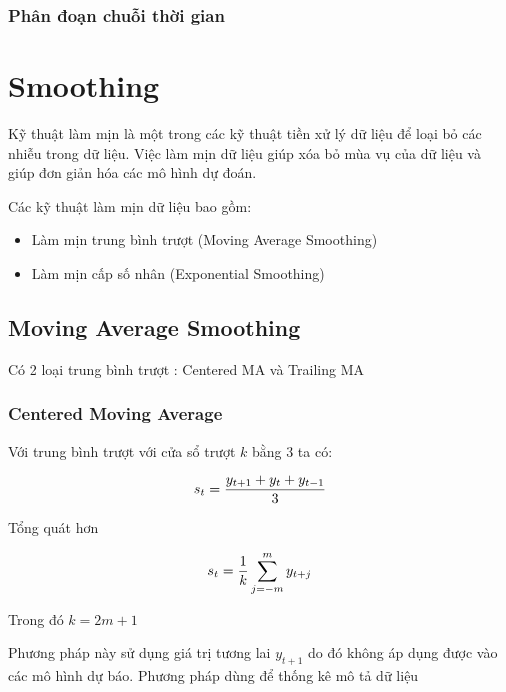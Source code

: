 \documentclass[
]{book}
\providecommand{\tightlist}{%
  \setlength{\itemsep}{0pt}\setlength{\parskip}{0pt}}
\begin{document}
\subsection{Phân đoạn chuỗi thời gian}\label{phuxe2n-ux111oux1ea1n-chuux1ed7i-thux1eddi-gian}

\chapter{Smoothing}\label{smoothing}

Kỹ thuật làm mịn là một trong các kỹ thuật tiền xử lý dữ liệu để loại bỏ các nhiễu trong dữ liệu. Việc làm mịn dữ liệu giúp xóa bỏ mùa vụ của dữ liệu và giúp đơn giản hóa các mô hình dự đoán.

Các kỹ thuật làm mịn dữ liệu bao gồm:

\begin{itemize}
\tightlist
\item
  Làm mịn trung bình trượt (Moving Average Smoothing)
\item
  Làm mịn cấp số nhân (Exponential Smoothing)
\end{itemize}

\section{Moving Average Smoothing}\label{moving-average-smoothing}

Có 2 loại trung bình trượt : Centered MA và Trailing MA

\subsection{Centered Moving Average}\label{centered-moving-average}

Với trung bình trượt với cửa sổ trượt \(k\) bằng 3 ta có:

\[\begin{aligned}
\Large s_{t} = \frac{y_{t+1} + y_{t} + y_{t-1}}{3}
\end{aligned}\]

Tổng quát hơn

\[\begin{aligned}
\Large s_{t} = \frac{1}{k}  \sum_{j=-m}^{m}{y_{t+j}}
\end{aligned}\]

Trong đó \(k = 2m + 1\)

Phương pháp này sử dụng giá trị tương lai \(y_{t+1}\) do đó không áp dụng được vào các mô hình dự báo. Phương pháp dùng để thống kê mô tả dữ liệu
\end{document}
